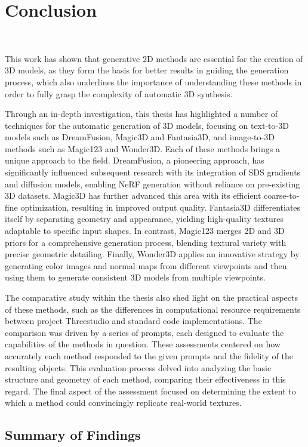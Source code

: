 \chapter{Conclusion}~\label{ch:conclusion}

This work has shown that generative 2D methods are essential for the creation of 3D models, as they form the basis for better results in guiding the generation process, which also underlines the importance of understanding these methods in order to fully grasp the complexity of automatic 3D synthesis.

Through an in-depth investigation, this thesis has highlighted a number of techniques for the automatic generation of 3D models, focusing on text-to-3D models such as DreamFusion, Magic3D and Fantasia3D, and image-to-3D methods such as Magic123 and Wonder3D. Each of these methods brings a unique approach to the field. DreamFusion, a pioneering approach, has significantly influenced subsequent research with its integration of SDS gradients and diffusion models, enabling NeRF generation without reliance on pre-existing 3D datasets. Magic3D has further advanced this area with its efficient coarse-to-fine optimization, resulting in improved output quality. Fantasia3D differentiates itself by separating geometry and appearance, yielding high-quality textures adaptable to specific input shapes. In contrast, Magic123 merges 2D and 3D priors for a comprehensive generation process, blending textural variety with precise geometric detailing. Finally, Wonder3D applies an innovative strategy by generating color images and normal maps from different viewpoints and then using them to generate consistent 3D models from multiple viewpoints.

The comparative study within the thesis also shed light on the practical aspects of these methods, such as the differences in computational resource requirements between project Threestudio and standard code implementations. The comparison was driven by a series of prompts, each designed to evaluate the capabilities of the methods in question. These assessments centered on how accurately each method responded to the given prompts and the fidelity of the resulting objects. This evaluation process delved into analyzing the basic structure and geometry of each method, comparing their effectiveness in this regard. The final aspect of the assessment focused on determining the extent to which a method could convincingly replicate real-world textures.

\section{Summary of Findings}

